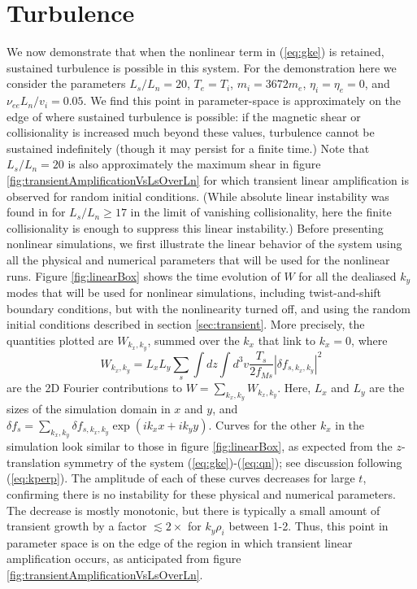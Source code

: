 \documentclass[12pt,superscriptaddress]{revtex4}
\newcommand{\nuee}{\nu_{ee}}
\begin{document}
\section{Turbulence}
\label{sec:turbulence}

We now demonstrate that when the nonlinear term in (\ref{eq:gke})
is retained, sustained turbulence is possible
in this system.
For the demonstration here we consider
the parameters $L_s/L_n = 20$, $T_e = T_i$, $m_i = 3672 m_e$, $\eta_i = \eta_e = 0$, and $\nuee L_n / v_i = 0.05$.
We find this point in parameter-space is approximately on the edge of where sustained turbulence
is possible: if the magnetic shear or collisionality is increased much beyond these values,
turbulence cannot be sustained indefinitely (though it may persist for a finite time.)
Note that $L_s/L_n=20$ is also approximately the maximum shear
in figure \ref{fig:transientAmplificationVsLsOverLn} for which transient linear amplification is observed
for random initial conditions.
(While absolute linear instability was found in \cite{usUniversalInstability} for $L_s/L_n \ge 17$ in the limit of vanishing collisionality, here the finite collisionality is enough to suppress this linear instability.)
Before presenting nonlinear simulations,
we first illustrate the linear behavior of the system using all the physical and numerical
parameters that will be used for the nonlinear runs.  Figure \ref{fig:linearBox} shows the time evolution of
$W$ for all the dealiased $k_y$ modes that will be
used for nonlinear simulations, including twist-and-shift boundary conditions,
but with the nonlinearity turned off, and
using the random initial conditions described in section \ref{sec:transient}.
More precisely, the quantities plotted are $W_{k_x,k_y}$, summed over the $k_x$ that link to $k_x=0$, where
\begin{equation}
\label{eq:Wk}
W_{k_x,k_y} = L_x L_y \sum_s \int dz \int d^3v \frac{T_s}{2 f_{Ms}}\left|\delta\! f_{s,k_x,k_y}\right|^2
\end{equation}
are the 2D Fourier contributions to $W = \sum_{k_x,k_y} W_{k_x,k_y}$.
Here,
$L_x$ and $L_y$ are the sizes of the simulation domain in $x$ and $y$,
and $\delta\! f_s =\sum_{k_x,k_y} \delta\! f_{s,k_x,k_y} \exp( i k_x x+i k_y y)$.
Curves for the other $k_x$ in the simulation look similar to those in figure \ref{fig:linearBox},
as expected from the $z$-translation symmetry of the system (\ref{eq:gke})-(\ref{eq:qn}); see discussion following (\ref{eq:kperp}).
The amplitude of each
of these curves decreases for large $t$, confirming there is no instability for these physical and
numerical parameters.  The decrease is mostly monotonic, but there is typically a small
amount of transient growth by a factor $ \lesssim 2\times$ for $k_y \rho_i$ between 1-2.
Thus, this point in parameter space is on the edge of the region in which transient linear
amplification occurs, as anticipated from figure \ref{fig:transientAmplificationVsLsOverLn}.
\end{document}
